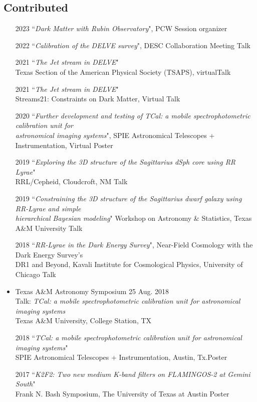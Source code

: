 \documentclass[11pt,letterpaper, sans]{moderncv}        %
\begin{document}
\subsection{Contributed}
\begin{itemize} [itemsep=1pt, leftmargin=28pt] %
\item [2023] ``\textit{Dark Matter with Rubin Observatory}", PCW \hfill Session organizer
\item [2022] ``\textit{Calibration of the DELVE survey}", DESC Collaboration Meeting \hfill Talk
\item[2021] ``\textit{The Jet stream in DELVE}" \\
Texas Section of the American Physical Society (TSAPS), virtual\hfill Talk

\item[2021] ``\textit{The Jet stream in DELVE}" \\
Streams21: Constraints on Dark Matter, Virtual \hfill Talk

\item[2020] ``\textit{Further development and testing of TCal: a mobile spectrophotometric calibration unit for\\ astronomical imaging systems}", 
SPIE Astronomical Telescopes + Instrumentation, Virtual \hfill Poster

\item[2019] ``\textit{Exploring the 3D structure of the Sagittarius dSph core using RR Lyrae}"\\
RRL/Cepheid, Cloudcroft, NM  \hfill Talk
 
\item[2019] ``\textit{Constraining the 3D structure of the Sagittarius dwarf galaxy using RR-Lyrae and simple\\ hierarchical
Bayesian modeling}" Workshop on Astronomy \& Statistics, Texas A\&M University \hfill Talk

\item [2018] ``\textit{RR-Lyrae in the Dark Energy Survey}",
Near-Field Cosmology with the Dark Energy Survey's\\
DR1 and Beyond, Kavali Institute for Cosmological Physics, University of Chicago \hfill Talk 

\item Texas A\&M Astronomy Symposium \hfill 25 Aug. 2018 \\
Talk: \textit{TCal: a mobile spectrophotometric calibration unit for astronomical imaging systems} \\
Texas A\&M University, College Station, TX

\item[2018] ``\textit{TCal: a mobile spectrophotometric calibration unit for astronomical imaging systems}"\\
SPIE Astronomical Telescopes + Instrumentation, Austin, Tx.\hfill Poster

\item [2017] ``\textit{K2F2: Two new medium K-band filters on FLAMINGOS-2 at Gemini South}"\\
Frank N. Bash Symposium, The University of Texas at Austin \hfill Poster
\end{itemize}
\end{document}
